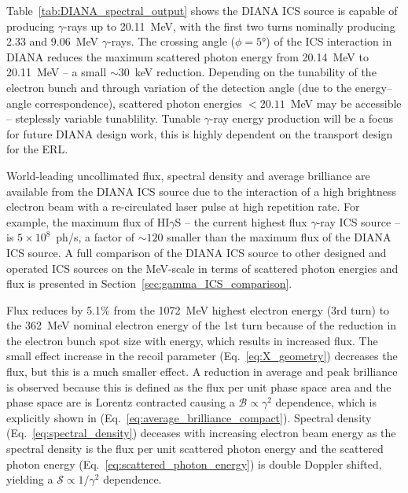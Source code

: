 \documentclass[../main.tex]{subfiles}
\begin{document}
Table~\ref{tab:DIANA_spectral_output} shows the DIANA ICS source is capable of producing $\gamma$-rays up to 20.11~\si{\mega\electronvolt}, with the first two turns nominally producing 2.33 and 9.06~\si{\mega\electronvolt} $\gamma$-rays. The crossing angle ($\phi=5\si{\degree}$) of the ICS interaction in DIANA reduces the maximum scattered photon energy from 20.14~\si{\mega\electronvolt} to 20.11~\si{\mega\electronvolt} -- a small $\sim 30$~\si{\kilo\electronvolt} reduction. Depending on the tunability of the electron bunch and through variation of the detection angle (due to the energy--angle correspondence), scattered photon energies $< 20.11$~\si{\mega\electronvolt} may be accessible -- steplessly variable tunablility. Tunable $\gamma$-ray energy production will be a focus for future DIANA design work, this is highly dependent on the transport design for the ERL. 

World-leading uncollimated flux, spectral density and average brilliance are available from the DIANA ICS source due to the interaction of a high brightness electron beam with a re-circulated laser pulse at high repetition rate. For example, the maximum flux of HI$\gamma$S \cite{weller2009research} -- the current highest flux $\gamma$-ray ICS source -- is $5\times 10^{8}$~ph/\si{\second}, a factor of $\sim 120$ smaller than the maximum flux of the DIANA ICS source.  A full comparison of the DIANA ICS source to other designed and operated ICS sources on the \si{\mega\electronvolt}-scale in terms of scattered photon energies and flux is presented in Section~\ref{sec:gamma_ICS_comparison}. 

Flux reduces by 5.1\% from the 1072~\si{\mega\electronvolt} highest electron energy (3rd turn) to the 362~\si{\mega\electronvolt}  nominal electron energy of the 1st turn because of the reduction in the electron bunch spot size with energy, which results in increased flux. The small effect increase in the recoil parameter (Eq.~\ref{eq:X_geometry}) decreases the flux, but this is a much smaller effect. A reduction in average and peak brilliance is observed because this is defined as the flux per unit phase space area and the phase space are is Lorentz contracted causing a $\mathcal{B}\propto \gamma^{2}$ dependence, which is explicitly shown in (Eq.~\ref{eq:average_brilliance_compact}). Spectral density (Eq.~\ref{eq:spectral_density}) deceases with increasing electron beam energy as the spectral density is the flux per unit scattered photon energy and the scattered photon energy (Eq.~\ref{eq:scattered_photon_energy}) is double Doppler shifted, yielding a $\mathcal{S}\propto 1/\gamma^{2}$ dependence.  
\end{document}

